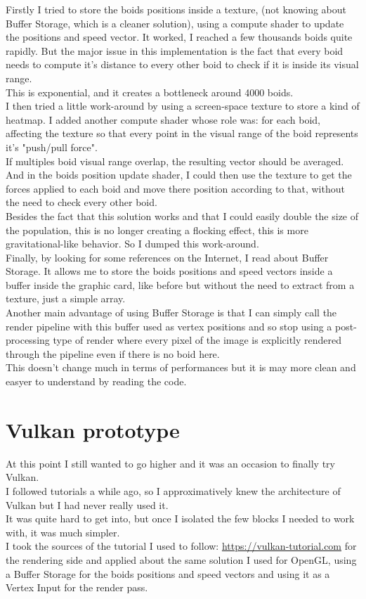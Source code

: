 \documentclass{article}
\begin{document}
Firstly I tried to store the boids positions inside a texture, (not knowing about Buffer Storage, which is a cleaner solution), using a compute shader to update the positions and speed vector. It worked, I reached a few thousands boids quite rapidly. But the major issue in this implementation is the fact that every boid needs to compute it's distance to every other boid to check if it is inside its visual range.\\
This is exponential, and it creates a bottleneck around 4000 boids.\\

I then tried a little work-around by using a screen-space texture to store a kind of heatmap. I added another compute shader whose role was: for each boid, affecting the texture so that every point in the visual range of the boid represents it's "push/pull force".\\
If multiples boid visual range overlap, the resulting vector should be averaged.\\
And in the boids position update shader, I could then use the texture to get the forces applied to each boid and move there position according to that, without the need to check every other boid.\\
Besides the fact that this solution works and that I could easily double the size of the population, this is no longer creating a flocking effect, this is more gravitational-like behavior. So I dumped this work-around.\\

Finally, by looking for some references on the Internet, I read about Buffer Storage. It allows me to store the boids positions and speed vectors inside a buffer inside the graphic card, like before but without the need to extract from a texture, just a simple array.\\
Another main advantage of using Buffer Storage is that I can simply call the render pipeline with this buffer used as vertex positions and so stop using a post-processing type of render where every pixel of the image is explicitly rendered through the pipeline even if there is no boid here.\\
This doesn't change much in terms of performances but it is may more clean and easyer to understand by reading the code.

\section{Vulkan prototype}
At this point I still wanted to go higher and it was an occasion to finally try Vulkan.\\
I followed tutorials a while ago, so I approximatively knew the architecture of Vulkan but I had never really used it.\\
It was quite hard to get into, but once I isolated the few blocks I needed to work with, it was much simpler.\\
I took the sources of the tutorial I used to follow: \url{https://vulkan-tutorial.com} for the rendering side and applied about the same solution I used for OpenGL, using a Buffer Storage for the boids positions and speed vectors and using it as a Vertex Input for the render pass.\\
\end{document}
